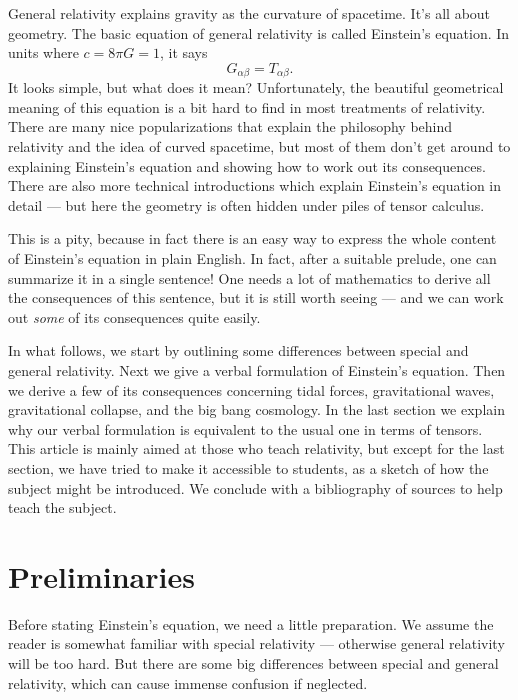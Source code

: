 General relativity explains gravity as the curvature of
spacetime.  It's all about geometry.  The basic equation
of general relativity is called Einstein's equation.   In units
where $c = 8 \pi G = 1$, it says
\begin{equation}
         G_{\alpha \beta} = T_{\alpha \beta} . 
\label{usualeinstein}\end{equation}
It looks simple, but what does it mean?   Unfortunately, the beautiful
geometrical meaning of this equation is a bit hard to find in most
treatments of relativity.  There are many nice popularizations that
explain the philosophy behind relativity and the idea of curved
spacetime, but most of them don't get around to explaining Einstein's
equation and showing how to work out its consequences.   There are
also more technical introductions which explain Einstein's equation in
detail --- but here the geometry is often hidden under piles of tensor 
calculus.

This is a pity, because in fact there is an easy way to express the
whole content of Einstein's equation in plain English.  In fact, after
a suitable prelude, one can summarize it in a single sentence!  One
needs a lot of mathematics to derive all the consequences of this
sentence, but it is still worth seeing --- and we can work out {\it
some} of its consequences quite easily.

In what follows, we start by outlining some differences between
special and general relativity.  Next we give a verbal formulation of
Einstein's equation.  Then we derive a few of its consequences
concerning tidal forces, gravitational waves, gravitational collapse,
and the big bang cosmology.  In the last section we explain why our
verbal formulation is equivalent to the usual one in terms of
tensors.  This article is mainly aimed at those who teach relativity,
but except for the last section, we have tried to make it accessible
to students, as a sketch of how the subject might be introduced.  We
conclude with a bibliography of sources to help teach the subject.

\section{Preliminaries}
\label{sec:prelim}

Before stating Einstein's equation, we need a little preparation.  We
assume the reader is somewhat familiar with special relativity ---
otherwise general relativity will be too hard.  But there are some big
differences between special and general relativity, which can cause
immense confusion if neglected.  

